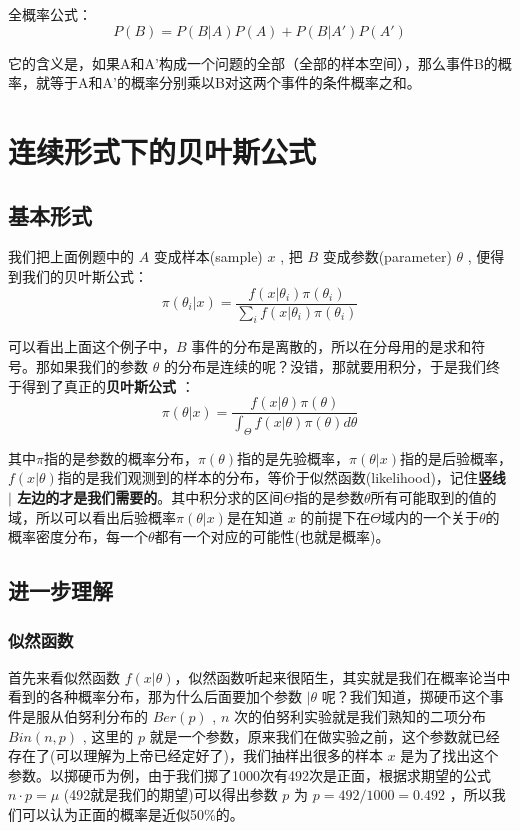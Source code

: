 \documentclass[12pt]{article}
\begin{document}
全概率公式：
$$
P(B) = P(B|A)P(A) + P(B|A')P(A')
$$

它的含义是，如果A和A'构成一个问题的全部（全部的样本空间），那么事件B的概率，就等于A和A'的概率分别乘以B对这两个事件的条件概率之和。

\section{连续形式下的贝叶斯公式}
\subsection{基本形式}
我们把上面例题中的 $A$ 变成样本(sample) $x$ , 把 $B$ 变成参数(parameter) $\theta$ , 便得到我们的贝叶斯公式：
$$
\pi(\theta_i|x) = \frac{f(x|\theta_i)\pi(\theta_i)}{\sum_if(x|\theta_i)\pi(\theta_i)}
$$

可以看出上面这个例子中，$B$ 事件的分布是离散的，所以在分母用的是求和符号。那如果我们的参数 $\theta$ 的分布是连续的呢？没错，那就要用积分，于是我们终于得到了真正的\textbf{贝叶斯公式} ：
$$
\pi(\theta|x) = \frac{f(x|\theta)\pi(\theta)}{\int_\Theta f(x|\theta)\pi(\theta)d\theta}
$$

其中$\pi$指的是参数的概率分布，$\pi(\theta)$指的是先验概率，$\pi(\theta|x)$指的是后验概率，  $f(x|\theta)$指的是我们观测到的样本的分布，等价于似然函数(likelihood)，记住\textbf{竖线 $|$ 左边的才是我们需要的}。其中积分求的区间$\Theta$指的是参数$\theta$所有可能取到的值的域，所以可以看出后验概率$\pi(\theta|x)$是在知道 $x$ 的前提下在$\Theta$域内的一个关于$\theta$的概率密度分布，每一个$\theta$都有一个对应的可能性(也就是概率)。

\subsection{进一步理解}
\subsubsection{似然函数}
首先来看似然函数 $f(x|\theta)$，似然函数听起来很陌生，其实就是我们在概率论当中看到的各种概率分布，那为什么后面要加个参数  $|\theta$ 呢？我们知道，掷硬币这个事件是服从伯努利分布的 $Ber(p)$ ,  $n$ 次的伯努利实验就是我们熟知的二项分布 $Bin(n,p)$ , 这里的 $p$ 就是一个参数，原来我们在做实验之前，这个参数就已经存在了(可以理解为上帝已经定好了)，我们抽样出很多的样本  $x$ 是为了找出这个参数。以掷硬币为例，由于我们掷了1000次有492次是正面，根据求期望的公式 $n \cdot p = \mu$ (492就是我们的期望)可以得出参数 $p$ 为 $p = 492/1000 = 0.492$  ，所以我们可以认为正面的概率是近似50\%的。
\end{document}
